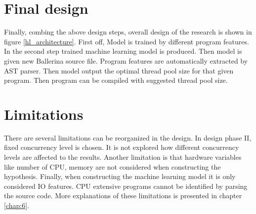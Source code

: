 \section{Final design}\label{sec:final_design}

Finally, combing the above design steps, overall design of the research is shown in figure \ref{hl_architecture}. First off, Model is trained by different program features. In the second step trained machine learning model is produced. Then model is given new Ballerina source file. Program features are automatically extracted by AST parser. Then model output the optimal thread pool size for that given program. Then program can be compiled with suggested thread pool size. 

\section{Limitations}

There are several limitations can be reorganized in  the design. In design phase II, fixed concurrency level is chosen. It is not explored how different concurrency levels are affected to the results. Another limitation is that  hardware variables like number of CPU, memory are not considered when constructing the hypothesis. Finally, when constructing the machine learning model it is only considered IO features. CPU extensive programs cannot be identified by parsing the source code. More explanations of these limitations is presented in chapter \ref{chap:6}.

